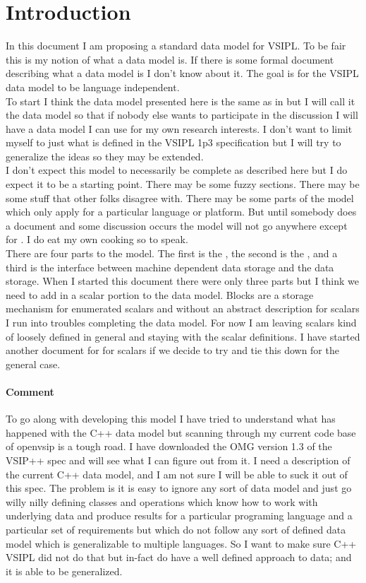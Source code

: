 \section*{Introduction}
In this document I am proposing a standard data model for VSIPL. To be fair this is my notion of what a data model is. If there is some formal document describing what a data model is I don't know about it. The goal is for the VSIPL data model to be language independent.
\\[6pt]
To start I think the data model presented here is the same as in \cvl{} but I will call it the \jv{} data model so that if nobody else wants to participate in the discussion I will have a data model I can use for my own research interests.  I don't want to limit myself to just what is defined in the VSIPL 1p3 specification but I will try to generalize the ideas so they may be extended.
\\[6pt]
I don't expect this model to necessarily be complete as described here but I do expect it to be a starting point.  There may be some fuzzy sections. There may be some stuff that other folks disagree with. There may be some parts of the model which only apply for a particular language or platform.  But until somebody does a document and some discussion occurs the model will not go anywhere except for \jv.  I do eat my own cooking so to speak.
\\[6pt]
There are four parts to the model. The first is the \Blk{}, the second is the \Vw{}, and a third is the interface between machine dependent data storage and the \Blk{} data storage. When I started this document there were only three parts but I think we need to add in a scalar portion to the data model. Blocks are a storage mechanism for enumerated scalars and without an abstract description for scalars I run into troubles completing the data model. For now I am leaving scalars kind of loosely defined in general and staying with the \cvl{} scalar definitions.  I have started another document for for scalars if we decide to try and tie this down for the general case.
\paragraph{Comment} To go along with developing this model I have tried to understand what has happened with the C++ data model but scanning through my current code base of openvsip is a tough road. I have downloaded the OMG version 1.3 of the VSIP++ spec and will see what I can figure out from it. I need a description of the current C++ data model, and I am  not sure I will be able to suck it out of this spec. The problem is it is easy to ignore any sort of data model and just go willy nilly defining classes and operations which know how to work with underlying data and produce results for a particular programing language and a particular set of requirements but which do not follow any sort of defined data model which is generalizable to multiple languages. So I want to make sure C++ VSIPL did not do that but in-fact do have a well defined approach to data; and it is able to be generalized.


